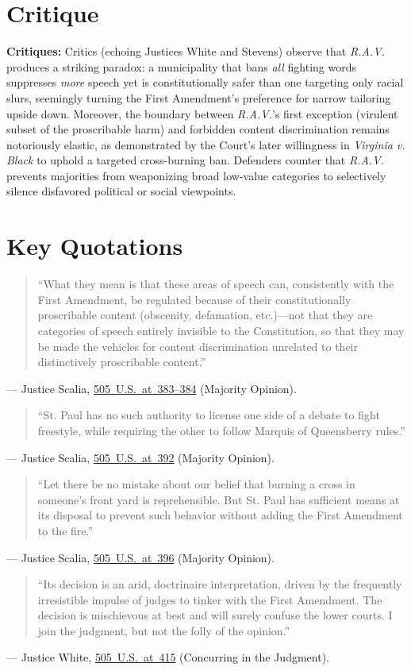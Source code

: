 \documentclass[12pt]{article}
\begin{document}
\section{Critique}
\textbf{Critiques:} Critics (echoing Justices White and Stevens) observe that \textit{R.A.V.} produces a striking paradox: a municipality that bans \textit{all} fighting words suppresses \textit{more} speech yet is constitutionally safer than one targeting only racial slurs, seemingly turning the First Amendment's preference for narrow tailoring upside down. Moreover, the boundary between \textit{R.A.V.}'s first exception (virulent subset of the proscribable harm) and forbidden content discrimination remains notoriously elastic, as demonstrated by the Court's later willingness in \textit{Virginia v. Black} to uphold a targeted cross-burning ban. Defenders counter that \textit{R.A.V.} prevents majorities from weaponizing broad low-value categories to selectively silence disfavored political or social viewpoints.

\section{Key Quotations}
\begin{quote}
``What they mean is that these areas of speech can, consistently with the First Amendment, be regulated because of their constitutionally proscribable content (obscenity, defamation, etc.)---not that they are categories of speech entirely invisible to the Constitution, so that they may be made the vehicles for content discrimination unrelated to their distinctively proscribable content.''
\end{quote}
\noindent --- Justice Scalia, \href{https://supreme.justia.com/cases/federal/us/505/377/}{505~U.S.~at~383--384} (Majority Opinion).

\begin{quote}
``St. Paul has no such authority to license one side of a debate to fight freestyle, while requiring the other to follow Marquis of Queensberry rules.''
\end{quote}
\noindent --- Justice Scalia, \href{https://supreme.justia.com/cases/federal/us/505/377/}{505~U.S.~at~392} (Majority Opinion).

\begin{quote}
``Let there be no mistake about our belief that burning a cross in someone's front yard is reprehensible. But St. Paul has sufficient means at its disposal to prevent such behavior without adding the First Amendment to the fire.''
\end{quote}
\noindent --- Justice Scalia, \href{https://supreme.justia.com/cases/federal/us/505/377/}{505~U.S.~at~396} (Majority Opinion).

\begin{quote}
``Its decision is an arid, doctrinaire interpretation, driven by the frequently irresistible impulse of judges to tinker with the First Amendment. The decision is mischievous at best and will surely confuse the lower courts. I join the judgment, but not the folly of the opinion.''
\end{quote}
\noindent --- Justice White, \href{https://supreme.justia.com/cases/federal/us/505/377/}{505~U.S.~at~415} (Concurring in the Judgment).
\end{document}
